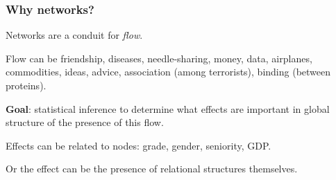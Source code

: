 \documentclass[slidestop,compress, 10pt]{beamer}
\begin{document}
\frame
{
\frametitle{Why networks?}
Networks are a conduit for \emph{flow}.  
\vspace{2mm}

Flow can be friendship, diseases, needle-sharing, money, data, airplanes, commodities, ideas, advice, 
association (among terrorists), binding (between proteins).
\vspace{5mm}

\textbf{Goal}: statistical inference to determine what effects are important
in global structure of the presence of this flow.

 \vspace{2mm}

Effects can be related to nodes: grade, gender, seniority, GDP.

Or the effect can be the presence of relational structures themselves.

}

\end{document}
